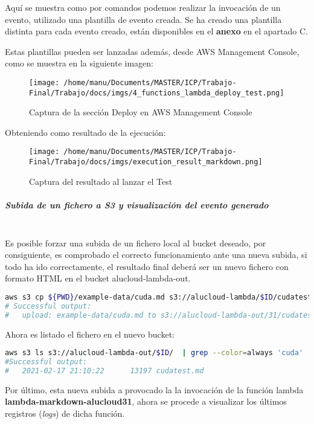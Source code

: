 \documentclass[
]{article}
\begin{document}
Aquí se muestra como por comandos podemos realizar la invocación de un
evento, utilizado una plantilla de evento creada. Se ha creado una
plantilla distinta para cada evento creado, están disponibles en el
\textbf{anexo} en el apartado C.

Estas plantillas pueden ser lanzadas además, desde AWS Management
Console, como se muestra en la siguiente imagen:

\begin{figure}[H]
\centering
\texttt{[image: /home/manu/Documents/MASTER/ICP/Trabajo-Final/Trabajo/docs/imgs/4\_functions\_lambda\_deploy\_test.png]}
\caption{Captura de la sección Deploy en AWS Management Console}
\end{figure}

Obteniendo como resultado de la ejecución:

\begin{figure}[H]
\centering
\texttt{[image: /home/manu/Documents/MASTER/ICP/Trabajo-Final/Trabajo/docs/imgs/execution\_result\_markdown.png]}
\caption{Captura del resultado al lanzar el Test}
\end{figure}
\hypertarget{header-n190}{%
\subparagraph{Subida de un fichero a S3 y visualización del evento
generado}\label{header-n190}}
\leavevmode
\\
Es posible forzar una subida de un fichero local al bucket deseado, por consiguiente, es comprobado el correcto funcionamiento ante una nueva subida, si todo ha ido correctamente, el resultado final deberá ser un nuevo fichero con formato HTML en el bucket alucloud-lambda-out. 
\begin{lstlisting}[language=bash,caption={Utilizar cp con aws}]
aws s3 cp ${PWD}/example-data/cuda.md s3://alucloud-lambda/$ID/cudatest.md
# Successful output: 
#   upload: example-data/cuda.md to s3://alucloud-lambda-out/31/cudatest.md
\end{lstlisting}

Ahora es listado el fichero en el nuevo bucket:

\begin{lstlisting}[language=bash,caption={Utilizar ls con aws}]
aws s3 ls s3://alucloud-lambda-out/$ID/  | grep --color=always 'cuda'
#Successful output:
#   2021-02-17 21:10:22      13197 cudatest.md
\end{lstlisting}

Por último, esta nueva subida a provocado la la invocación de la función
lambda \textbf{lambda-markdown-alucloud31}, ahora se procede a
visualizar los últimos registros (\emph{logs}) de dicha función.
\end{document}
